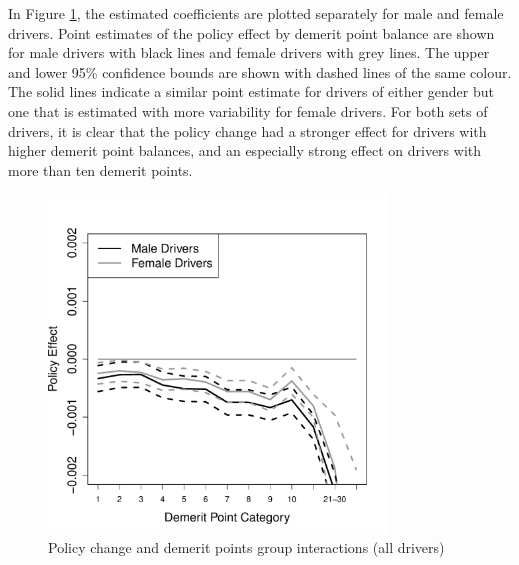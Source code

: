 \documentclass[12pt]{paper}
\begin{document}







In Figure \ref{fig:FE_regs_all_pts}, the estimated coefficients are plotted separately for male and female drivers. 
Point estimates of the policy effect by demerit point balance are shown for male drivers with black lines and female drivers with grey lines. 
The upper and lower 95\% confidence bounds are shown with dashed lines of the same colour. 
The solid lines indicate a similar point estimate for drivers of either gender but one that is estimated with more variability for female drivers. 
For both sets of drivers, it is clear that the policy change had a stronger effect for drivers with 
higher demerit point balances, and an especially strong effect on drivers with more than ten demerit points. 



\begin{figure}
\centering
\includegraphics[width=0.8\textwidth]{../Figures/FFX_reg_policy_points_grp_all_pts.pdf}
\caption{Policy change and demerit points group interactions (all drivers)}
% 
\label{fig:FE_regs_all_pts}
\end{figure}
\end{document}
